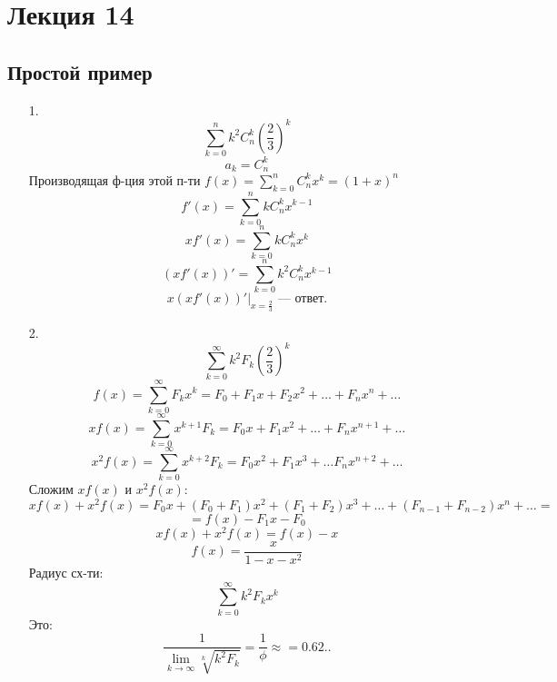 \section{Лекция 14}
\subsection{Простой пример}
\begin{example}
\begin{itemize}
  \item [1. ] \[
  \sum_{k = 0}^{n} k^{2} C_{n}^{k} \left(\frac{2}{3}\right)^{k}
  \]
  \[
  a_k = C_{n}^{k}
  \]
  Производящая ф-ция этой п-ти $f(x) = \sum_{k = 0}^{n} C_{n}^{k} x^{k} = (1 + x)^{n}$
  \[
  f'(x) = \sum_{k = 0}^{n} kC_{n}^{k} x^{k - 1}
  \]
  \[
  xf'(x) = \sum_{k = 0}^{n} kC_{n}^{k} x^{k}
  \]
  \[
    (xf'(x))' = \sum_{k = 0}^{n} k^{2} C_{n}^{k} x^{k - 1}
  \]
  \[
    x(xf'(x))'|_{x = \frac{2}{3}} \text{ --- ответ.}
  \]
\item [2. ] \[
\sum_{k = 0}^{\infty} k^{2} F_k \left(\frac{2}{3}\right)^{k}
\]
\[
  f(x) = \sum_{k = 0}^{\infty} F_k x^{k} = F_0 + F_1x + F_2x^{2} + \ldots + F_n x^{n} + \ldots
\]
  \[
  xf(x) = \sum_{k = 0}^{\infty} x^{k + 1} F_k = F_0x + F_1 x^{2} + \ldots + F_n x^{n + 1} + \ldots
  \]
  \[
  x^{2}f(x) = \sum_{k = 0}^{\infty} x^{k + 2} F_k = F_0 x^{2} + F_1 x^{3} + \ldots F_n x^{n + 2} + \ldots
  \]
  Сложим $xf(x)$ и $x^{2}f(x)$:
  \[
  xf(x) + x^{2}f(x) = F_0 x + (F_0 + F_1)x^{2} + (F_1 + F_2) x^{3} + \ldots + (F_{n - 1} + F_{n - 2}) x^{n} + \ldots = 
  \]
  \[
   = f(x) - F_1x - F_0
  \]
  \[
  xf(x) + x^{2}f(x) = f(x) - x 
  \]
  \[
  f(x) = \frac{x}{1 - x - x^{2}}
  \]
  Радиус сх-ти:
  \[
  \sum_{k = 0}^{\infty} k^{2} F_k x^{k}
  \]
  Это:
  \[
  \frac{1}{\lim_{k\to \infty} \sqrt[k]{k^{2} F_k}} = \frac{1}{\phi} \approx = 0.62..
  \]
\end{itemize}
\end{example}
